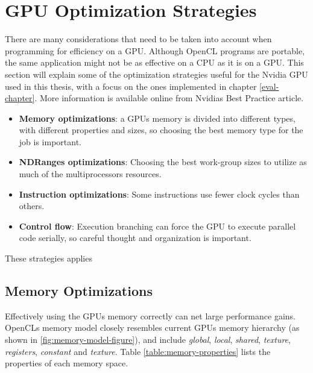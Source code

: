 \section{GPU Optimization Strategies}

There are many considerations that need to be taken into account when
programming for efficiency on a GPU. Although OpenCL programs are
portable, the same application might not be as effective on a CPU as
it is on a GPU. This section will explain some of the optimization
strategies useful for the Nvidia GPU used in this thesis, with a focus
on the ones implemented in chapter \ref{eval-chapter}. More
information is available online from Nvidias Best Practice
article\cite{nvidia-best-practice}.



\begin{itemize}

\item \textbf{Memory optimizations}: a GPUs memory is divided into different
  types, with different properties and sizes, so choosing the best
  memory type for the job is important.

\item \textbf{NDRanges optimizations}: Choosing the best work-group
  sizes to utilize as much of the multiprocessors resources.

\item \textbf{Instruction optimizations}: Some instructions use fewer
  clock cycles than others.

\item \textbf{Control flow}: Execution branching can force the GPU to
  execute parallel code serially, so careful thought and organization
  is important.

\end{itemize}

These strategies applies 

\subsection{Memory Optimizations}

Effectively using the GPUs memory correctly can net large performance
gains. OpenCLs memory model closely resembles current GPUs memory
hierarchy (as shown in \ref{fig:memory-model-figure}), and include
\textit{global}, \textit{local}, \textit{shared}, \textit{texture},
\textit{registers}, \textit{constant} and \textit{texture}. Table
\ref{table:memory-properties} lists the properties of each memory
space.

